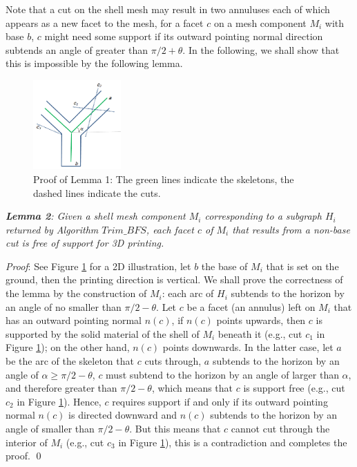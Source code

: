 {{Note that a cut on the shell mesh may result in two annuluses each of which appears as a new facet to the mesh, for a facet $c$ on a mesh component $M_i$ with base $b$, $c$ might need some support if its outward pointing normal direction subtends an angle of greater than $\pi/2 + \theta$. In the following, we shall show that this is impossible by the following lemma.

\begin{figure}[b]
  \centering
  \includegraphics[width=0.3\textwidth]{figs/nonbasecut.png}
  \caption{\label{fig:nonbasecut}%
           Proof of Lemma 1: The green lines indicate the skeletons, the dashed lines indicate the cuts.}
\end{figure}


\emph{\textbf{Lemma 2}: Given a shell mesh component $M_i$ corresponding to a subgraph $H_i$ returned by Algorithm $Trim\_BFS$, each facet $c$ of $M_i$ that results from a non-base cut is free of support for 3D printing.}

\emph{Proof}:  See Figure \ref{fig:nonbasecut} for a 2D illustration, let $b$ the base of $M_i$ that is set on the ground, then the printing direction is vertical. We shall prove the correctness of the lemma by the construction of $M_i$: each arc of $H_i$ subtends to the horizon by an angle of no smaller than $\pi/2 - \theta$. Let $c$ be a facet (an annulus) left on $M_i$ that has an outward pointing normal $n(c)$, if $n(c)$ points upwards, then $c$ is supported by the solid material of the shell of $M_i$ beneath it (e.g., cut $c_1$ in Figure \ref{fig:nonbasecut}); on the other hand, $n(c)$ points downwards. In the latter case, let $a$ be the arc of the skeleton that $c$ cuts through, $a$ subtends to the horizon by an angle of $\alpha \geq  \pi/2 - \theta$, $c$ must subtend to the horizon by an angle of larger than $\alpha$, and therefore greater than $\pi/2 - \theta$, which means that $c$ is support free (e.g., cut $c_2$ in Figure \ref{fig:nonbasecut}).
Hence, $c$ requires support if and only if its outward pointing normal $n(c)$ is directed downward and $n(c)$ subtends to the horizon by an angle of smaller than $\pi/2 - \theta$. But this means that $c$ cannot cut through the interior of $M_i$ (e.g., cut $c_3$ in Figure \ref{fig:nonbasecut}), this is a contradiction and completes the proof. \qed }}


